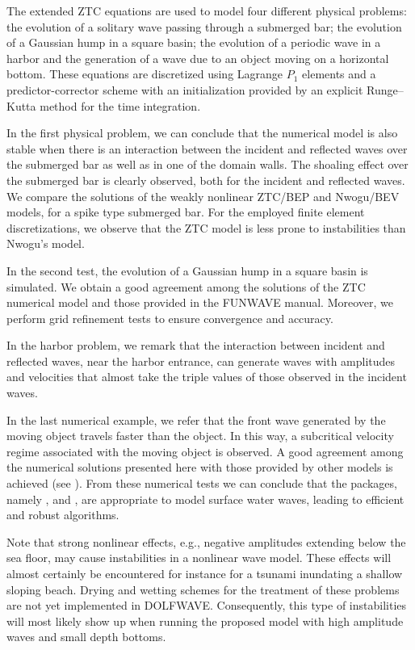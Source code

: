 The extended ZTC equations are used to model four different physical
problems: the evolution of a solitary wave passing through a submerged
bar; the evolution of a Gaussian hump in a square basin; the evolution
of a periodic wave in a harbor and the generation of a wave due to an
object moving on a horizontal bottom.  These equations are discretized
using Lagrange $P_1$ elements and a predictor-corrector scheme with an
initialization provided by an explicit Runge--Kutta method for the
time integration.

In the first physical problem, we can conclude that the numerical
model is also stable when there is an interaction between the incident
and reflected waves over the submerged bar as well as in one of the
domain walls. The shoaling effect over the submerged bar is clearly
observed, both for the incident and reflected waves.  We compare the
solutions of the weakly nonlinear ZTC/BEP and Nwogu/BEV models, for a
spike type submerged bar.  For the employed finite element
discretizations, we observe that the ZTC model is less prone to
instabilities than Nwogu's model.

In the second test, the evolution of a Gaussian hump in a square basin
is simulated.  We obtain a good agreement among the solutions of the
ZTC numerical model and those provided in the FUNWAVE manual.
Moreover, we perform grid refinement tests to ensure convergence and
accuracy.

In the harbor problem, we remark that the interaction between incident
and reflected waves, near the harbor entrance, can generate waves with
amplitudes and velocities that almost take the triple values of those
observed in the incident waves.

In the last numerical example, we refer that the front wave generated
by the moving object travels faster than the object.  In this way, a
subcritical velocity regime associated with the moving object is
observed.  A good agreement among the numerical solutions presented
here with those provided by other models is achieved (see
).  From these numerical tests we can conclude that
the \fenics packages, namely \dolfin, \ufl and \ffc, are appropriate
to model surface water waves, leading to efficient and robust
algorithms.

Note that strong nonlinear effects, e.g., negative amplitudes
extending below the sea floor, may cause instabilities in a nonlinear
wave model.  These effects will almost certainly be encountered for
instance for a tsunami inundating a shallow sloping beach.  Drying and
wetting schemes for the treatment of these problems are not yet
implemented in DOLFWAVE.  Consequently, this type of instabilities
will most likely show up when running the proposed model with high
amplitude waves and small depth bottoms.


